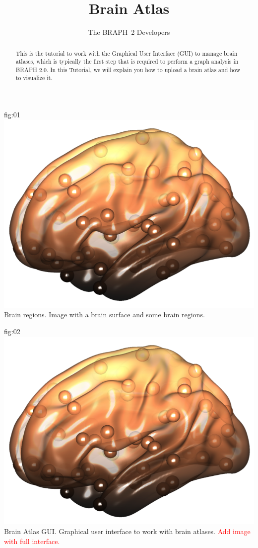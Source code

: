 \documentclass{tufte-handout}
\title{Brain Atlas}
\author[The BRAPH~2 Developers]{The BRAPH~2 Developers}
\begin{document}
\maketitle
	
	{fig:01}
	{\includegraphics{tut_ba/fig1.png}}
	{Brain regions.}
	{
	Image with a brain surface and some brain regions.
	}

\begin{abstract}
\noindent
This is the tutorial to work with the Graphical User Interface (GUI) to manage brain atlases, which is typically the first step that is required to perform a graph analysis in BRAPH 2.0. 
In this Tutorial, we will explain you how to upload a brain atlas and how to visualize it.
\end{abstract}

\tableofcontents

	{fig:02}
	{\includegraphics[height=10cm]{tut_ba/fig1.png}}
	{Brain Atlas GUI.}
	{
	Graphical user interface to work with brain atlases. 
	\textcolor{red}{Add image with full interface.}
	}
\end{document}
